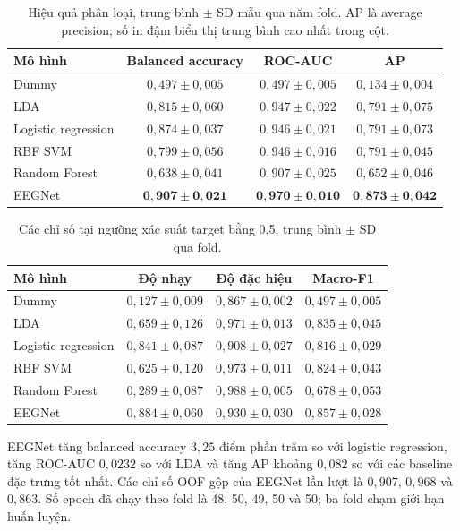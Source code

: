 \documentclass[11pt,a4paper]{article}
\begin{document}
\begin{table}[htbp]
\centering\small
\caption{Hiệu quả phân loại, trung bình $\pm$ SD mẫu qua năm fold. AP là average precision; số in đậm biểu thị trung bình cao nhất trong cột.}
\label{tab:models}
\setlength{\tabcolsep}{4pt}
\begin{tabular}{lccc}
\toprule
Mô hình & Balanced accuracy & ROC-AUC & AP\\\midrule
Dummy & $0{,}497\pm0{,}005$ & $0{,}497\pm0{,}005$ & $0{,}134\pm0{,}004$\\
LDA & $0{,}815\pm0{,}060$ & $0{,}947\pm0{,}022$ & $0{,}791\pm0{,}075$\\
Logistic regression & $0{,}874\pm0{,}037$ & $0{,}946\pm0{,}021$ & $0{,}791\pm0{,}073$\\
RBF SVM & $0{,}799\pm0{,}056$ & $0{,}946\pm0{,}016$ & $0{,}791\pm0{,}045$\\
Random Forest & $0{,}638\pm0{,}041$ & $0{,}907\pm0{,}025$ & $0{,}652\pm0{,}046$\\
EEGNet & $\mathbf{0{,}907\pm0{,}021}$ & $\mathbf{0{,}970\pm0{,}010}$ & $\mathbf{0{,}873\pm0{,}042}$\\\bottomrule
\end{tabular}
\end{table}

\begin{table}[htbp]
\centering\small
\caption{Các chỉ số tại ngưỡng xác suất target bằng 0,5, trung bình $\pm$ SD qua fold.}
\label{tab:threshold}
\begin{tabular}{lccc}
\toprule
Mô hình & Độ nhạy & Độ đặc hiệu & Macro-F1\\\midrule
Dummy & $0{,}127\pm0{,}009$ & $0{,}867\pm0{,}002$ & $0{,}497\pm0{,}005$\\
LDA & $0{,}659\pm0{,}126$ & $0{,}971\pm0{,}013$ & $0{,}835\pm0{,}045$\\
Logistic regression & $0{,}841\pm0{,}087$ & $0{,}908\pm0{,}027$ & $0{,}816\pm0{,}029$\\
RBF SVM & $0{,}625\pm0{,}120$ & $0{,}973\pm0{,}011$ & $0{,}824\pm0{,}043$\\
Random Forest & $0{,}289\pm0{,}087$ & $0{,}988\pm0{,}005$ & $0{,}678\pm0{,}053$\\
EEGNet & $0{,}884\pm0{,}060$ & $0{,}930\pm0{,}030$ & $0{,}857\pm0{,}028$\\\bottomrule
\end{tabular}
\end{table}

EEGNet tăng balanced accuracy $3{,}25$ điểm phần trăm so với logistic regression, tăng ROC-AUC $0{,}0232$ so với LDA và tăng AP khoảng $0{,}082$ so với các baseline đặc trưng tốt nhất. Các chỉ số OOF gộp của EEGNet lần lượt là $0{,}907$, $0{,}968$ và $0{,}863$. Số epoch đã chạy theo fold là 48, 50, 49, 50 và 50; ba fold chạm giới hạn huấn luyện.
\end{document}
